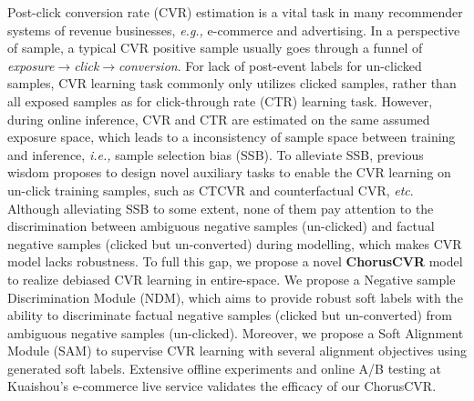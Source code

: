 Post-click conversion rate (CVR) estimation is a vital task in many recommender systems of revenue businesses, \emph{e.g.,} e-commerce and advertising. In a perspective of sample, a typical CVR positive sample usually goes through a funnel of \textit{exposure}$\to$\textit{click}$\to$\textit{conversion}. For lack of post-event labels for un-clicked samples, CVR learning task commonly only utilizes clicked samples, rather than all exposed samples as for click-through rate (CTR) learning task. However, during online inference, CVR and CTR are estimated on the same assumed exposure space, which leads to a inconsistency of sample space between training and inference, \emph{i.e.,} sample selection bias (SSB). To alleviate SSB, previous wisdom proposes to design novel auxiliary tasks to enable the CVR learning on un-click training samples, such as CTCVR and counterfactual CVR, \emph{etc}. Although alleviating SSB to some extent, none of them pay attention to the discrimination between ambiguous negative samples (un-clicked) and factual negative samples (clicked but un-converted) during modelling, which makes CVR model lacks robustness. To full this gap, we propose a novel \textbf{ChorusCVR} model to realize debiased CVR learning in entire-space. We propose a Negative sample Discrimination Module (NDM), which aims to provide robust soft labels with the ability to discriminate factual negative samples (clicked but un-converted) from ambiguous negative samples (un-clicked). Moreover, we propose a  Soft Alignment Module (SAM) to supervise CVR learning with several alignment objectives using generated soft labels. 
Extensive offline experiments and online A/B testing at Kuaishou’s e-commerce live service validates the efficacy of our ChorusCVR. 